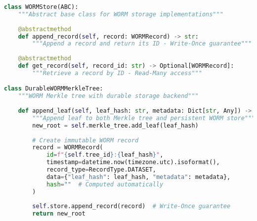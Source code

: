 \documentclass[12pt,a4paper]{article}
\begin{document}
\begin{lstlisting}[language=Python, caption=WORM Storage Architecture]
class WORMStore(ABC):
    """Abstract base class for WORM storage implementations"""
    
    @abstractmethod
    def append_record(self, record: WORMRecord) -> str:
        """Append a record and return its ID - Write-Once guarantee"""
        
    @abstractmethod
    def get_record(self, record_id: str) -> Optional[WORMRecord]:
        """Retrieve a record by ID - Read-Many access"""

class DurableWORMMerkleTree:
    """WORM Merkle tree with durable storage backend"""
    
    def append_leaf(self, leaf_hash: str, metadata: Dict[str, Any]) -> str:
        """Append leaf to both Merkle tree and persistent WORM store"""
        new_root = self.merkle_tree.add_leaf(leaf_hash)
        
        # Create immutable WORM record
        record = WORMRecord(
            id=f"{self.tree_id}:{leaf_hash}",
            timestamp=datetime.now(timezone.utc).isoformat(),
            record_type=RecordType.DATASET,
            data={"leaf_hash": leaf_hash, "metadata": metadata},
            hash=""  # Computed automatically
        )
        
        self.store.append_record(record)  # Write-Once guarantee
        return new_root
\end{lstlisting}
\end{document}
